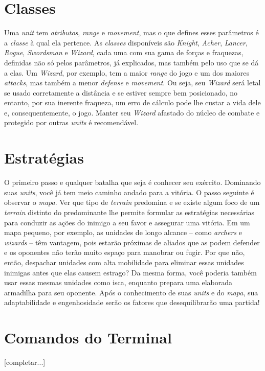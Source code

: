\documentclass{article}
\begin{document}
\section{Classes}
Uma \emph{unit} tem \emph{atributos}, \emph{range} e \emph{movement}, mas o que defines esses parâmetros é a \emph{classe} à qual ela pertence. As \emph{classes} disponíveis são \emph{Knight}, \emph{Acher}, \emph{Lancer}, \emph{Rogue}, \emph{Swordsman} e \emph{Wizard}, cada uma com sua gama de forças e fraquezas, definidas não só pelos parâmetros, já explicados, mas também pelo uso que se dá a elas. Um \emph{Wizard}, por exemplo, tem a maior \emph{range} do jogo e um dos maiores \emph{attacks}, mas também a menor \emph{defense} e \emph{movement}. Ou seja, seu \emph{Wizard} será letal se usado corretamente a distância e se estiver sempre bem posicionado, no entanto, por sua inerente fraqueza, um erro de cálculo pode lhe custar a vida dele e, consequentemente, o jogo. Manter seu \emph{Wizard} afastado do núcleo de combate e protegido por outras \emph{units} é recomendável. 

\section{Estratégias}
O primeiro passo e qualquer batalha que seja é conhecer seu exército. Dominando suas \emph{units}, você já tem meio caminho andado para a vitória. O passo seguinte é observar o \emph{mapa}. Ver que tipo de \emph{terrain} predomina e se existe algum foco de um \emph{terrain} distinto do predominante lhe permite formular as estratégias necessárias para conduzir as ações do inimigo a seu favor e assegurar uma vitória. Em um mapa pequeno, por exemplo, as unidades de longo alcance -- como \emph{archers} e \emph{wizards} -- têm vantagem, pois estarão próximas de aliados que as podem defender e os oponentes não terão muito espaço para manobrar ou fugir. Por que não, então, despachar unidades com alta mobilidade para eliminar essas unidades inimigas antes que elas causem estrago? Da mesma forma, você poderia também usar essas mesmas unidades como isca, enquanto prepara uma elaborada armadilha para seu oponente. Após o conhecimento de suas \emph{units} e do \emph{mapa}, sua adaptabilidade e engenhosidade serão os fatores que desequilibrarão uma partida!

\section{Comandos do Terminal}
[completar...]
\end{document}
